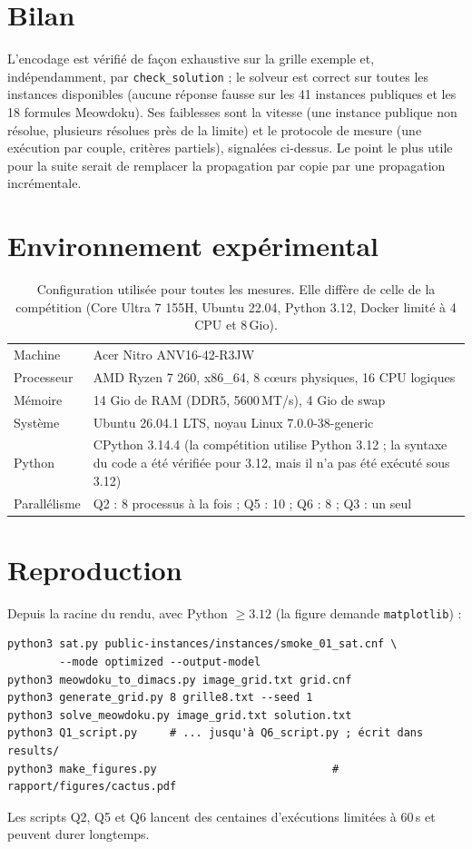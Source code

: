 \documentclass[11pt,a4paper]{article}
\begin{document}
\section{Bilan}\label{sec:bilan}

L'encodage est vérifié de façon exhaustive sur la grille exemple et, indépendamment, par \texttt{check\_solution} ; le solveur est correct sur toutes les instances disponibles (aucune réponse fausse sur les 41 instances publiques et les 18 formules Meowdoku). Ses faiblesses sont la vitesse (une instance publique non résolue, plusieurs résolues près de la limite) et le protocole de mesure (une exécution par couple, critères partiels), signalées ci-dessus. Le point le plus utile pour la suite serait de remplacer la propagation par copie par une propagation incrémentale.

\appendix
\section{Environnement expérimental}\label{sec:setup}

\begin{table}[H]
\centering\small
\begin{tabular}{@{}p{4.2cm}p{11.2cm}@{}}
\toprule
Machine & Acer Nitro ANV16-42-R3JW\\
Processeur & AMD Ryzen 7 260, x86\_64, 8 c\oe urs physiques, 16 CPU logiques\\
Mémoire & 14 Gio de RAM (DDR5, 5600\,MT/s), 4 Gio de swap\\
Système & Ubuntu 26.04.1 LTS, noyau Linux 7.0.0-38-generic\\
Python & CPython 3.14.4 (la compétition utilise Python 3.12 ; la syntaxe du code a été vérifiée pour 3.12, mais il n'a pas été exécuté sous 3.12)\\
Parallélisme & Q2 : 8 processus à la fois ; Q5 : 10 ; Q6 : 8 ; Q3 : un seul\\
\bottomrule
\end{tabular}
\caption{Configuration utilisée pour toutes les mesures. Elle diffère de celle de la compétition (Core Ultra 7 155H, Ubuntu 22.04, Python 3.12, Docker limité à 4 CPU et 8\,Gio).}
\end{table}

\section{Reproduction}
Depuis la racine du rendu, avec Python $\ge3.12$ (la figure demande \texttt{matplotlib}) :
\begin{verbatim}
python3 sat.py public-instances/instances/smoke_01_sat.cnf \
        --mode optimized --output-model
python3 meowdoku_to_dimacs.py image_grid.txt grid.cnf
python3 generate_grid.py 8 grille8.txt --seed 1
python3 solve_meowdoku.py image_grid.txt solution.txt
python3 Q1_script.py     # ... jusqu'à Q6_script.py ; écrit dans results/
python3 make_figures.py                           # rapport/figures/cactus.pdf
\end{verbatim}
Les scripts Q2, Q5 et Q6 lancent des centaines d'exécutions limitées à 60\,s et peuvent durer longtemps.
\end{document}
